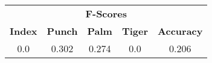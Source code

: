 \documentclass{standalone}
\begin{document}
 
 \begin{tabular}{|c|c|c|c ||c|}
\cline{1-5}\multicolumn{5}{|c|}{\textbf{F-Scores}} \\ 
\cline{1-5}\textbf{Index} & \textbf{Punch} & \textbf{Palm} & \textbf{Tiger} & \textbf{Accuracy}\\ 
\cline{1-5}0.0 & 0.302 & 0.274 & 0.0 & 0.206\\ 
 \cline{1-5}\hline \end{tabular}
 
\end{document}
